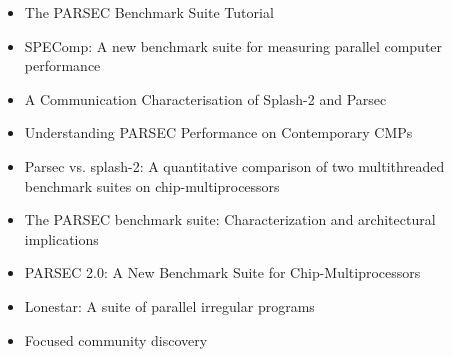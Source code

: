 \begin{itemize}
\item The PARSEC Benchmark Suite Tutorial \cite{Bienia2009}
\item SPEComp: A new benchmark suite for measuring parallel computer
  performance \cite{Aslot2001}
\item A Communication Characterisation of Splash-2 and Parsec
  \cite{Barrow-Williams2009}
\item Understanding PARSEC Performance on Contemporary CMPs
  \cite{Bhadauria2009}
\item Parsec vs. splash-2: A quantitative comparison of two
  multithreaded benchmark suites on chip-multiprocessors
  \cite{Bienia2008}
\item The PARSEC benchmark suite: Characterization and architectural
  implications \cite{Bienia2008a}
\item PARSEC 2.0: A New Benchmark Suite for Chip-Multiprocessors
  \cite{Bienia2009a}
\item Lonestar: A suite of parallel irregular programs
  \cite{Kulkarni2009}
\item Focused community discovery \cite{Hildrum2005}
\end{itemize}


